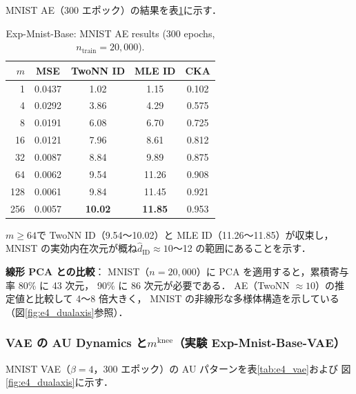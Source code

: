 \documentclass[11pt,a4paper]{jsarticle}
\newcommand{\mknee}{m^{\mathrm{knee}}}
\begin{document}
MNIST AE（300 エポック）の結果を表\ref{tab:e4_ae}に示す．

\begin{table}[H]
\centering
\caption{Exp-Mnist-Base: MNIST AE results (300 epochs, $n_\mathrm{train}=20{,}000$).}
\label{tab:e4_ae}
\small
\begin{tabular}{rcccc}
\toprule
$m$ & MSE & TwoNN ID & MLE ID & CKA \\
\midrule
1   & 0.0437 & 1.02  & 1.15  & 0.102 \\
4   & 0.0292 & 3.86  & 4.29  & 0.575 \\
8   & 0.0191 & 6.08  & 6.70  & 0.725 \\
16  & 0.0121 & 7.96  & 8.61  & 0.812 \\
32  & 0.0087 & 8.84  & 9.89  & 0.875 \\
64  & 0.0062 & 9.54  & 11.26 & 0.908 \\
128 & 0.0061 & 9.84  & 11.45 & 0.921 \\
256 & 0.0057 & \textbf{10.02} & \textbf{11.85} & 0.953 \\
\bottomrule
\end{tabular}
\end{table}

$m \geq 64$で TwoNN ID（9.54〜10.02）と MLE ID（11.26〜11.85）が収束し，
MNIST の実効内在次元が概ね$\hat{d}_\mathrm{ID} \approx 10$〜12 の範囲にあることを示す．

\textbf{線形 PCA との比較}：
MNIST（$n = 20{,}000$）に PCA を適用すると，累積寄与率 80\% に 43 次元，
90\% に 86 次元が必要である．
AE（TwoNN $\approx 10$）の推定値と比較して 4〜8 倍大きく，
MNIST の非線形な多様体構造を示している（図\ref{fig:e4_dualaxis}参照）．

\subsubsection{VAE の AU Dynamics と$\mknee$（実験 Exp-Mnist-Base-VAE）}

MNIST VAE（$\beta = 4$，300 エポック）の AU パターンを表\ref{tab:e4_vae}および
図\ref{fig:e4_dualaxis}に示す．
\end{document}
